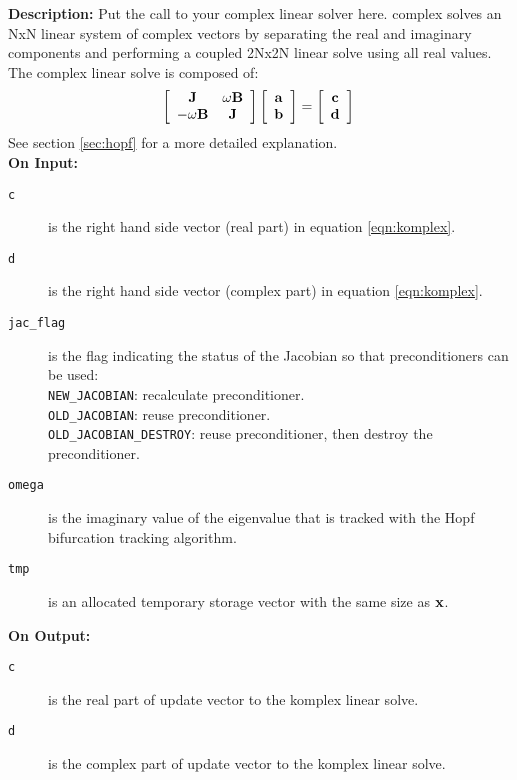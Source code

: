{\bf Description:}  Put the call to your complex linear solver here. complex solves an NxN linear system of complex vectors by separating the real and imaginary components and performing a coupled 2Nx2N linear solve using all real values.  The complex linear solve is composed of: \\
\begin{equation}
\left[\begin{array}{cc} {\bf J} & \omega {\bf B} \\ -\omega {\bf B} & {\bf J} \end{array}\right]
\left[\begin{array}{c} {\bf a} \\ {\bf b} \end{array}\right] =
\left[\begin{array}{c} {\bf c} \\ {\bf d} \end{array}\right] 
\\
\label{eqn:komplex}
\end{equation} 
See section \ref{sec:hopf} for a more detailed explanation.\\

{\bf On Input:}
\begin{description}
\item[\texttt{c}] is the right hand side vector (real part) in equation \ref{eqn:komplex}.
\item[\texttt{d}] is the right hand side vector (complex part) in equation \ref{eqn:komplex}.
\item[\texttt{jac\_flag}] is the flag indicating the status of the Jacobian so that preconditioners can be used: \\
\texttt{NEW\_JACOBIAN}:   recalculate preconditioner. \\
\texttt{OLD\_JACOBIAN}:   reuse preconditioner. \\
\texttt{OLD\_JACOBIAN\_DESTROY}:   reuse preconditioner, then destroy the preconditioner.
\item[\texttt{omega}] is the imaginary value of the eigenvalue that is tracked with the Hopf bifurcation tracking algorithm. 
\item[\texttt{tmp}] is an allocated temporary storage vector with the same size as ${\bf x}$.
\end{description}

{\bf On Output:}
\begin{description}
\item[\texttt{c}] is the real part of update vector to the komplex linear solve.
\item[\texttt{d}] is the complex part of update vector to the komplex linear solve.
\end{description}

